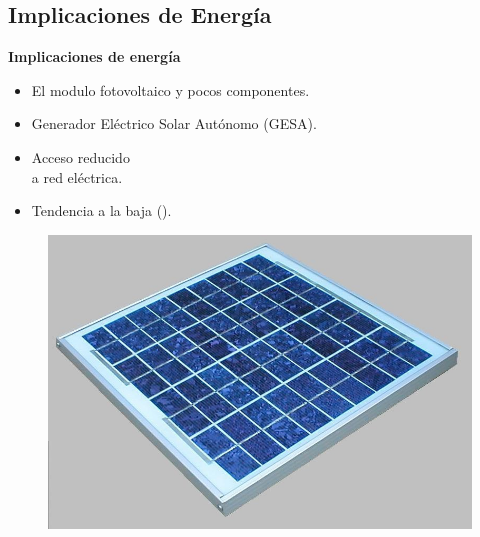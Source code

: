 \documentclass[aspectratio=43, handout]{beamer}
\begin{document}
\subsection[Energía]{Implicaciones de Energía}
\begin{frame}{\textbf{\LARGE{Implicaciones de energía}}} 
\fontsize{15pt}{15}\selectfont
\begin{minipage}[c]{1.0\linewidth}
	\begin{minipage}[c]{0.57\linewidth}
		\begin{itemize}
			\item El modulo fotovoltaico y pocos componentes.
					\vspace{10px}
			\item Generador Eléctrico Solar Autónomo (GESA).
					\vspace{10px}
			\item Acceso reducido\\a red eléctrica.
					\vspace{10px}
			\item Tendencia a la baja (\textdollar).
			\vspace{10px}
		\end{itemize}

\end{minipage}
	\begin{minipage}[c]{0.40\linewidth}
		\begin{figure}[H]			
		\includegraphics[width=1.2\textwidth]{./imagenes/ks10t.jpg}
		\end{figure}	  	  	
	\end{minipage}
\end{minipage}
\end{frame}
\end{document}
